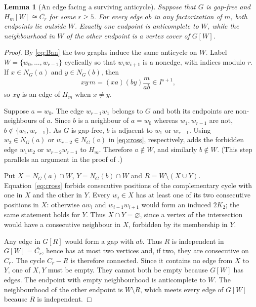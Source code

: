\documentclass[11pt,a4paper]{article}
\newtheorem{lemma}[theorem]{Lemma}
\theoremstyle{remark}\newtheorem{remark}[theorem]{Remark}
\begin{document}
\begin{lemma}[An edge facing a surviving anticycle]\label{lem:anticycle}
Suppose that $G$ is gap-free and $H_m[W]\cong\overline{C_r}$ for some $r\ge5$. For every edge $ab$ in any factorization of $m$, both endpoints lie outside $W$. Exactly one endpoint is anticomplete to $W$, while the neighbourhood in $W$ of the other endpoint is a vertex cover of $G[W]$.
\end{lemma}
\begin{proof}
By \eqref{eq:Ban} the two graphs induce the same anticycle on $W$. Label $W=\{w_0,\ldots,w_{r-1}\}$ cyclically so that $w_iw_{i+1}$ is a nonedge, with indices modulo $r$. If $x\in N_G(a)$ and $y\in N_G(b)$, then
\begin{equation}\label{eq:cross}
 xy\,m=(xa)(by)\frac{m}{ab}\in I^{s+1},
\end{equation}
so $xy$ is an edge of $H_m$ when $x\ne y$.

Suppose $a=w_0$. The edge $w_{r-1}w_1$ belongs to $G$ and both its endpoints are non-neighbours of $a$. Since $b$ is a neighbour of $a=w_0$ whereas $w_1,w_{r-1}$ are not, $b\notin\{w_1,w_{r-1}\}$. As $G$ is gap-free, $b$ is adjacent to $w_1$ or $w_{r-1}$. Using $w_2\in N_G(a)$ or $w_{r-2}\in N_G(a)$ in \eqref{eq:cross}, respectively, adds the forbidden edge $w_1w_2$ or $w_{r-2}w_{r-1}$ to $H_m$. Therefore $a\notin W$, and similarly $b\notin W$. (This step parallels an argument in the proof of \cite[Theorem 6.17]{Banerjee}.)

Put $X=N_G(a)\cap W$, $Y=N_G(b)\cap W$ and $R=W\setminus(X\cup Y)$. Equation~\eqref{eq:cross} forbids consecutive positions of the complementary cycle with one in $X$ and the other in $Y$. Every $w_i\in X$ has at least one of its two consecutive positions in $X$: otherwise $aw_i$ and $w_{i-1}w_{i+1}$ would form an induced $2K_2$; the same statement holds for $Y$. Thus $X\cap Y=\varnothing$, since a vertex of the intersection would have a consecutive neighbour in $X$, forbidden by its membership in $Y$.

Any edge in $G[R]$ would form a gap with $ab$. Thus $R$ is independent in $G[W]=\overline{C_r}$, hence has at most two vertices and, if two, they are consecutive on $C_r$. The cycle $C_r-R$ is therefore connected. Since it contains no edge from $X$ to $Y$, one of $X,Y$ must be empty. They cannot both be empty because $G[W]$ has edges. The endpoint with empty neighbourhood is anticomplete to $W$. The neighbourhood of the other endpoint is $W\setminus R$, which meets every edge of $G[W]$ because $R$ is independent.
\end{proof}
\end{document}
